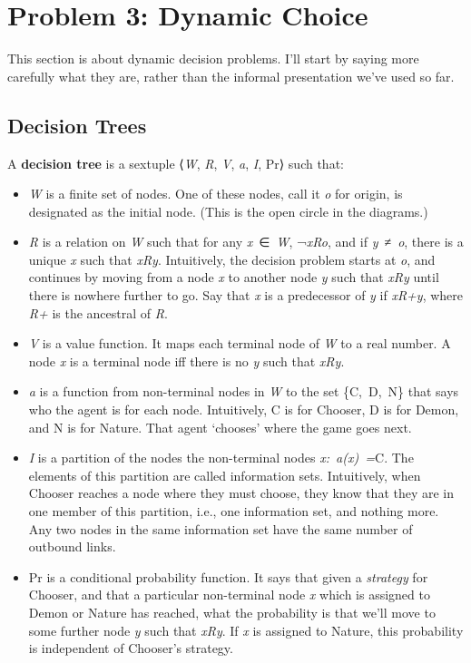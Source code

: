 \documentclass[
  10pt,
  letterpaper,
  DIV=11,
  numbers=noendperiod,
  twoside]{scrartcl}
\providecommand{\tightlist}{%
  \setlength{\itemsep}{0pt}\setlength{\parskip}{0pt}}\usepackage{longtable,booktabs,array}
\begin{document}
\section{Problem 3: Dynamic Choice}\label{sec-dual-mandate}

This section is about dynamic decision problems. I'll start by saying
more carefully what they are, rather than the informal presentation
we've used so far.

\subsection{Decision Trees}\label{sec-decision-tree}

A \textbf{decision tree} is a sextuple ⟨\emph{W}, \emph{R}, \emph{V},
\emph{a}, \emph{I}, Pr⟩ such that:

\begin{itemize}
\tightlist
\item
  \emph{W} is a finite set of nodes. One of these nodes, call it
  \emph{o} for origin, is designated as the initial node. (This is the
  open circle in the diagrams.)
\item
  \emph{R} is a relation on \emph{W} such that for any
  \emph{x}~∈~\emph{W}, ¬\emph{xRo}, and if \emph{y}~≠~\emph{o}, there is
  a unique \emph{x} such that \emph{xRy}. Intuitively, the decision
  problem starts at \emph{o}, and continues by moving from a node
  \emph{x} to another node \emph{y} such that \emph{xRy} until there is
  nowhere further to go. Say that \emph{x} is a predecessor of \emph{y}
  if \emph{xR+y}, where \emph{R+} is the ancestral of \emph{R}.
\item
  \emph{V} is a value function. It maps each terminal node of \emph{W}
  to a real number. A node \emph{x} is a terminal node iff there is no
  \emph{y} such that \emph{xRy}.
\item
  \emph{a} is a function from non-terminal nodes in \emph{W} to the set
  \{C,~D,~N\} that says who the agent is for each node. Intuitively, C
  is for Chooser, D is for Demon, and N is for Nature. That agent
  `chooses' where the game goes next.
\item
  \emph{I} is a partition of the nodes the non-terminal nodes
  \emph{x:~a(x)~=}C. The elements of this partition are called
  information sets. Intuitively, when Chooser reaches a node where they
  must choose, they know that they are in one member of this partition,
  i.e., one information set, and nothing more. Any two nodes in the same
  information set have the same number of outbound links.
\item
  Pr is a conditional probability function. It says that given a
  \emph{strategy} for Chooser, and that a particular non-terminal node
  \emph{x} which is assigned to Demon or Nature has reached, what the
  probability is that we'll move to some further node \emph{y} such that
  \emph{xRy}. If \emph{x} is assigned to Nature, this probability is
  independent of Chooser's strategy.
\end{itemize}
\end{document}
